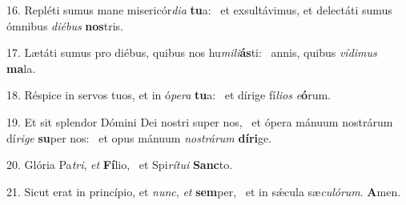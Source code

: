 16. Repléti sumus mane misericór\textit{di}\textit{a} \textbf{tu}a: \ast\  et exsultávimus, et delectáti sumus ómnibus \textit{di}\textit{é}\textit{bus} \textbf{nos}tris.\

17. Lætáti sumus pro diébus, quibus nos hu\textit{mi}\textit{li}\textbf{ás}ti: \ast\  annis, quibus \textit{ví}\textit{di}\textit{mus} \textbf{ma}la.\

18. Réspice in servos tuos, et in ó\textit{pe}\textit{ra} \textbf{tu}a: \ast\  et dírige fí\textit{li}\textit{os} \textit{e}\textbf{ó}rum.\

19. Et sit splendor Dómini Dei nostri super nos, \dag\  et ópera mánuum nostrárum dí\textit{ri}\textit{ge} \textbf{su}per nos: \ast\  et opus mánuum \textit{nos}\textit{trá}\textit{rum} \textbf{dí}\textbf{ri}ge.\

20. Glória Pa\textit{tri}, \textit{et} \textbf{Fí}lio, \ast\  et Spi\textit{rí}\textit{tu}\textit{i} \textbf{Sanc}to.\

21. Sicut erat in princípio, et \textit{nunc}, \textit{et} \textbf{sem}per, \ast\  et in sǽcula sæ\textit{cu}\textit{ló}\textit{rum}. \textbf{A}men.\

